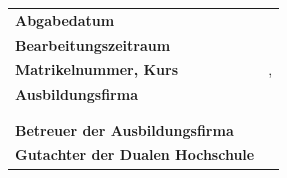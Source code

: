 {\begin{titlepage}
\begin{center}
		\begin{spacing}{0.8}
			\begin{tabular}{ll}
				\textbf{Abgabedatum}				\hspace{4.5cm}					& \printdate{\abgabeDatum}\\[0.2cm]
				\textbf{Bearbeitungszeitraum}       				&  \daterange{\bearbeitungszeitraumBeginn}{\bearbeitungszeitraumEnde}\\[0.2cm]
				\textbf{Matrikelnummer, Kurs} 					   	&  \matrikelnr, \kurs\\[0.2cm]
				\textbf{Ausbildungsfirma}              					 &  \firmaName\\
																						& \firmaStrasse \\
																						& \firmaPlz\\[0.2cm]
				\textbf{Betreuer der Ausbildungsfirma}          &  \betreuerFirma\\[0.2cm]
				\textbf{Gutachter der Dualen Hochschule}    &  \betreuerDhbw\\[0.2cm]
			\end{tabular} 
		\end{spacing}
	\end{center}
\end{titlepage}
}